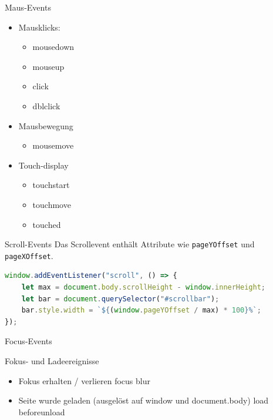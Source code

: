 \begin{definition}{Maus-Events}
  
  \begin{minipage}{0.45\linewidth}
  \begin{itemize}
  \item Mausklicks:
  \begin{itemize}
    \item mousedown
    \item mouseup
    \item click
    \item dblclick
  \end{itemize}
  \end{itemize}
  \end{minipage}
  \begin{minipage}{0.5\linewidth}
    \begin{itemize}
    \item Mausbewegung
    \begin{itemize}
      \item mousemove
    \end{itemize}
    \item Touch-display
    \begin{itemize}
      \item touchstart
      \item touchmove
      \item touched
    \end{itemize}
    \end{itemize}
    \end{minipage}
\end{definition}

\begin{definition}{Scroll-Events}
Das Scrollevent enthält Attribute wie \texttt{pageYOffset} und \texttt{pageXOffset}.
\begin{lstlisting}[language=JavaScript, style=basesmol]
window.addEventListener("scroll", () => {
    let max = document.body.scrollHeight - window.innerHeight;
    let bar = document.querySelector("#scrollbar");
    bar.style.width = `${(window.pageYOffset / max) * 100}%`;
});
\end{lstlisting}
\end{definition}

\begin{definition}{Focus-Events}

Fokus- und Ladeereignisse
\begin{itemize}
  \item Fokus erhalten / verlieren
  \subitem focus
  \subitem blur
  \item Seite wurde geladen (ausgelöst auf window und document.body)
  \subitem load
  \subitem beforeunload
\end{itemize}
\end{definition}

